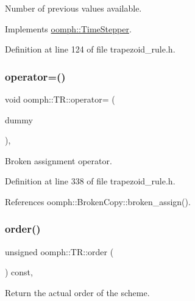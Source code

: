 Number of previous values available. 



Implements \hyperlink{classoomph_1_1TimeStepper_a0f38713ed304c18d9f7b5cf8131664c1}{oomph\+::\+Time\+Stepper}.



Definition at line 124 of file trapezoid\+\_\+rule.\+h.

\mbox{\label{classoomph_1_1TR_ae121ff7b44a9e0f2f5a6ff90a13e6f20}} 
\subsubsection{\texorpdfstring{operator=()}{operator=()}}
{\footnotesize\ttfamily void oomph\+::\+T\+R\+::operator= (\begin{DoxyParamCaption}\item[{const \hyperlink{classoomph_1_1TR}{TR} \&}]{dummy }\end{DoxyParamCaption})\hspace{0.3cm}{\ttfamily [inline]}, {\ttfamily [private]}}



Broken assignment operator. 



Definition at line 338 of file trapezoid\+\_\+rule.\+h.



References oomph\+::\+Broken\+Copy\+::broken\+\_\+assign().

\mbox{\label{classoomph_1_1TR_a007e98e499c2440b05947b626d610425}} 
\subsubsection{\texorpdfstring{order()}{order()}}
{\footnotesize\ttfamily unsigned oomph\+::\+T\+R\+::order (\begin{DoxyParamCaption}{ }\end{DoxyParamCaption}) const\hspace{0.3cm}{\ttfamily [inline]}, {\ttfamily [virtual]}}



Return the actual order of the scheme. 



